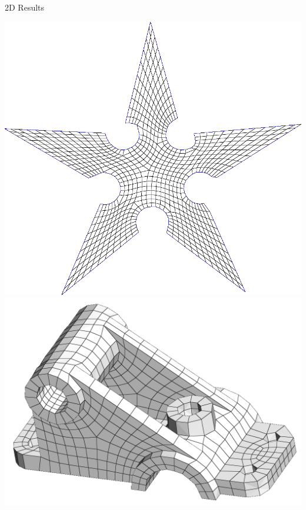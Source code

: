 \documentclass{beamer}
\begin{document}
\begin{frame}{2D Results}
\begin{minipage}[c]{0.45\textwidth}
    \includegraphics[width=0.7\linewidth]{img_spm_ff/quads_nonortho_shurik0.PNG}
    \includegraphics[width=0.8\linewidth]{img_spm_ff/q_2.PNG}
    \end{minipage}
\end{frame} 
\end{document}
